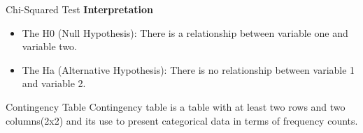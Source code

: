 \begin{frame}[t]{Chi-Squared Test}
\textbf{Interpretation}
\begin{itemize}
	\item The H0 (Null Hypothesis): There is a relationship between variable one and variable two.
	\item The Ha (Alternative Hypothesis): There is no relationship between variable 1 and variable 2.
\end{itemize}

\end{frame}

\begin{frame}[t]{Contingency Table}
	Contingency table is a table with at least two rows and two columns(2x2) and its use to present categorical data in terms of frequency counts.	
\end{frame}
















